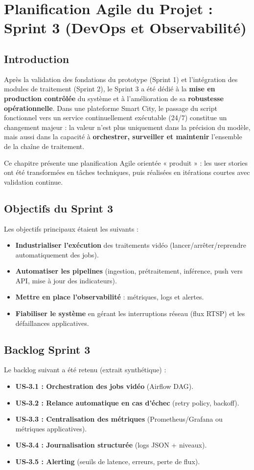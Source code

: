 \chapter{Planification Agile du Projet : Sprint 3 (DevOps et Observabilité)}

\section{Introduction}
Après la validation des fondations du prototype (Sprint 1) et l’intégration des modules de traitement (Sprint 2), le Sprint 3 a été dédié à la \textbf{mise en production contrôlée} du système et à l’amélioration de sa \textbf{robustesse opérationnelle}. Dans une plateforme Smart City, le passage du script fonctionnel vers un service continuellement exécutable (24/7) constitue un changement majeur : la valeur n’est plus uniquement dans la précision du modèle, mais aussi dans la capacité à \textbf{orchestrer, surveiller et maintenir} l’ensemble de la chaîne de traitement.

Ce chapitre présente une planification Agile orientée « produit » : les user stories ont été transformées en tâches techniques, puis réalisées en itérations courtes avec validation continue.

\section{Objectifs du Sprint 3}
Les objectifs principaux étaient les suivants :
\begin{itemize}
    \item \textbf{Industrialiser l’exécution} des traitements vidéo (lancer/arrêter/reprendre automatiquement des jobs).
    \item \textbf{Automatiser les pipelines} (ingestion, prétraitement, inférence, push vers API, mise à jour des indicateurs).
    \item \textbf{Mettre en place l’observabilité} : métriques, logs et alertes.
    \item \textbf{Fiabiliser le système} en gérant les interruptions réseau (flux RTSP) et les défaillances applicatives.
\end{itemize}

\section{Backlog Sprint 3}
Le backlog suivant a été retenu (extrait synthétique) :
\begin{itemize}
    \item \textbf{US-3.1 : Orchestration des jobs vidéo} (Airflow DAG).
    \item \textbf{US-3.2 : Relance automatique en cas d’échec} (retry policy, backoff).
    \item \textbf{US-3.3 : Centralisation des métriques} (Prometheus/Grafana ou métriques applicatives).
    \item \textbf{US-3.4 : Journalisation structurée} (logs JSON + niveaux).
    \item \textbf{US-3.5 : Alerting} (seuils de latence, erreurs, perte de flux).
\end{itemize}

